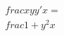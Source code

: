 \documentclass[preview]{standalone}
\begin{document}
\begin{align*}
\quad\\frac{xyy'}{x}=\quad\\frac{ {{1+y^2}} }{x}
\end{align*}
\end{document}

